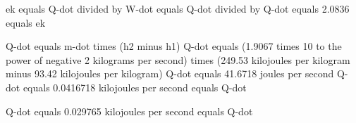 ek equals Q-dot divided by W-dot equals Q-dot divided by Q-dot equals 2.0836 equals ek  

Q-dot equals m-dot times (h2 minus h1)  
Q-dot equals (1.9067 times 10 to the power of negative 2 kilograms per second) times (249.53 kilojoules per kilogram minus 93.42 kilojoules per kilogram)  
Q-dot equals 41.6718 joules per second  
Q-dot equals 0.0416718 kilojoules per second equals Q-dot  

Q-dot equals 0.029765 kilojoules per second equals Q-dot